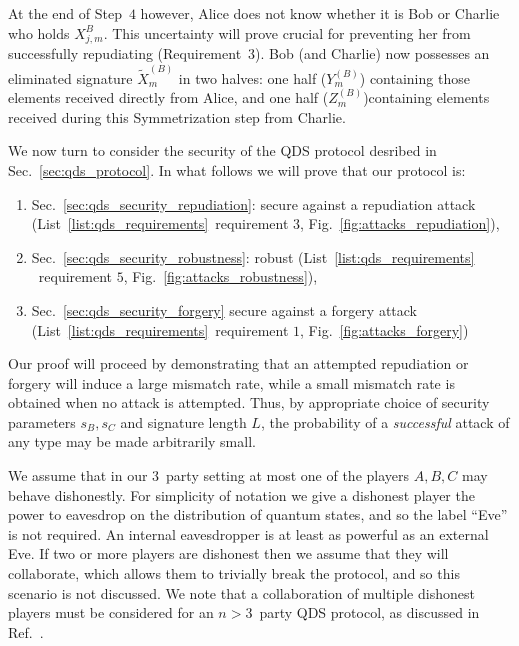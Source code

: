  At the end of Step~$4$ however, Alice does not know whether it is Bob or Charlie who holds $X_{j, m}^B$. This uncertainty will prove crucial for preventing her from successfully repudiating (Requirement~$3$). Bob (and Charlie) now possesses an eliminated signature $\tilde{X}_m^{\left(B\right)}$ in two halves: one half ($Y_m^{\left(B\right)}$) containing those elements received directly from Alice, and one half ($Z_m^{\left(B\right)}$)containing elements received during this Symmetrization step from Charlie.
 \fi


We now turn to consider the security of the QDS protocol desribed in Sec.~\ref{sec:qds_protocol}. %
In what follows we will prove that our protocol is:
\begin{enumerate}
\item Sec.~\ref{sec:qds_security_repudiation}: secure against a repudiation attack (List~\ref{list:qds_requirements}~requirement $3$, Fig.~\ref{fig:attacks_repudiation}), 
\item Sec.~\ref{sec:qds_security_robustness}: robust (List~\ref{list:qds_requirements} ~requirement $5$, Fig.~\ref{fig:attacks_robustness}),
\item Sec.~\ref{sec:qds_security_forgery} secure against a forgery attack (List~\ref{list:qds_requirements}~requirement $1$, Fig.~\ref{fig:attacks_forgery})
\end{enumerate}

Our proof will proceed by demonstrating that an attempted repudiation or forgery will induce a large mismatch rate, while a small mismatch rate is obtained when no attack is attempted. Thus, by appropriate choice of security parameters $s_B, s_C$ and signature length $L$, the probability of a \emph{successful} attack of any type may be made arbitrarily small. 

We assume that in our $3$~party setting at most one of the players $A, B, C$ may behave dishonestly. For simplicity of notation we give a dishonest player the power to eavesdrop on the distribution of quantum states, and so the label ``Eve'' is not required. An internal eavesdropper is at least as powerful as an external Eve. If two or more players are dishonest then we assume that they will collaborate, which allows them to trivially break the protocol, and so this scenario is not discussed. We note that a collaboration of multiple dishonest players must be considered for an $n>3$~party QDS protocol, as discussed in Ref.~\cite{Arrazola2015}.

